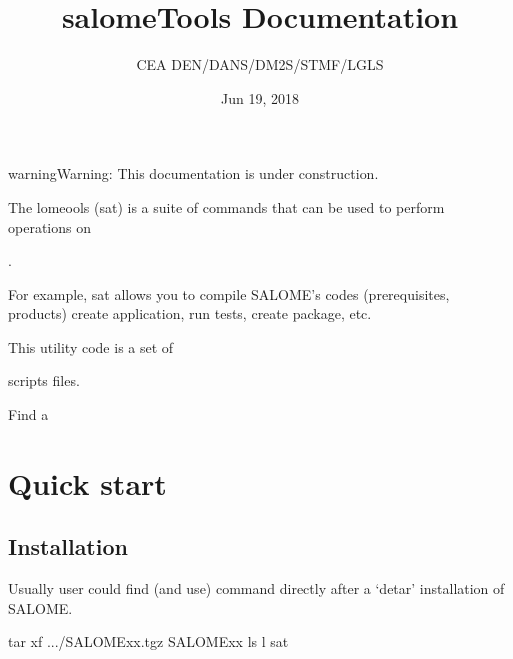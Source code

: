 \documentclass[a4paper,10pt,english]{sphinxmanual}
\title{salomeTools Documentation}
\date{Jun 19, 2018}
\author{CEA DEN/DANS/DM2S/STMF/LGLS}
\begin{document}
\maketitle
\sphinxtableofcontents
{}\label{\detokenize{index::doc}}
\clearpage




\begin{sphinxadmonition}{warning}{Warning:}
This documentation is under construction.
\end{sphinxadmonition}

The lomeools (sat) is a suite of commands
that can be used to perform operations on %
\begin{footnote}[1]\sphinxAtStartFootnote
{}
%
\end{footnote}.

For example, sat allows you to compile SALOME’s codes
(prerequisites, products)
create application, run tests, create package, etc.

This utility code is a set of %
\begin{footnote}[2]\sphinxAtStartFootnote
{}
%
\end{footnote} scripts files.

Find a 


\chapter{Quick start}
\label{\detokenize{index:quick-start}}\label{\detokenize{index:salome-tools}}

\section{Installation}
\label{\detokenize{installation_of_sat:installation}}\label{\detokenize{installation_of_sat::doc}}
Usually user could find (and use) command  directly after a ‘detar’ installation of SALOME.

%
\begin{sphinxVerbatim}[commandchars=\\\{\}]
tar \PYGZhy{}xf .../SALOME\PYGZus{}xx.tgz
 SALOME\PYGZus{}xx
ls \PYGZhy{}l sat      
\end{sphinxVerbatim}
\end{document}
